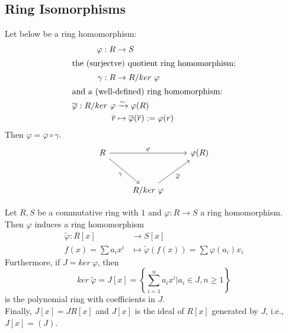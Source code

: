 \subsection{Ring Isomorphisms}

\begin{definition}
 Let below be a ring homomorphism:
\begin{align}
\varphi: R &\rightarrow S \nonumber \\
\intertext{the (surjectve) quotient ring homomorphism:}
\gamma: R &\rightarrow R/ker \ \varphi \nonumber \\
\intertext{and a (well-defined) ring homomorphism:}
\overline{\varphi}: R/ker \ \varphi &\xrightarrow{\sim} \varphi(R) \nonumber \\
\overline{r} &\mapsto \overline{\varphi}(\overline{r}) := \varphi(r) \nonumber
\end{align}
Then $\varphi = \overline{\varphi} \circ \gamma$.
\begin{equation}\label{diagram}
\begin{tikzcd}
R \arrow{rr}{\varphi} \arrow[swap]{dr}{\gamma} & & \varphi(R) \\[10pt]
    & R/ker \ \varphi \arrow[swap]{ur}{\overline{\varphi}}
\end{tikzcd} \nonumber
\end{equation}	
\end{definition}


\begin{remark}
Let $R, S$ be a commutative ring with $1$ and $\varphi: R \rightarrow S$ a ring homomorphism.\\
Then $\varphi$ induces a ring homomorphism 
\begin{align}
\tilde{\varphi}: R[x] &\rightarrow S[x] \nonumber \\
f(x)=\sum a_i x^i &\mapsto \widetilde{\varphi}(f(x)) = \sum \varphi(a_i) x_i \nonumber
\end{align}
Furthermore, if $J=ker \ \varphi$, then 
\begin{equation}
ker \ \widetilde{\varphi} = J[x] = \left\{\sum_{i=1}^{n} a_i x^i | a_i \in J, n \geq 1 \right\} \nonumber
\end{equation}
is the polynomial ring with coefficients in $J$. \\
Finally, $J[x] = J R[x]$ and $J[x]$ is the ideal of $R[x]$ generated by $J$, i.e., $J[x] = (J)$.\\
\end{remark}


